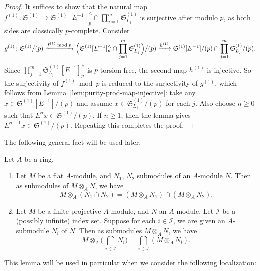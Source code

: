 \begin{proof} 
It suffices to show that the natural map $f^{(1)}\colon \mathfrak{S}^{(1)} \to \mathfrak{S}^{(1)} [E^{-1}]^{\wedge}_p \cap  \prod_{j=1}^m  \mathfrak{S}_{L_j}^{(1)}$ is surjective after modulo $p$, as both sides are classically $p$-complete. Consider 
\[ 
g^{(1)}\colon \mathfrak{S}^{(1)}/(p) \xrightarrow{f^{(1)}\bmod{p}} 
\Bigl( \mathfrak{S}^{(1)} [E^{-1}]^{\wedge}_p \cap \prod_{j =1}^m  \mathfrak{S}_{L_j}^{(1)}\Bigr)/(p)
\xrightarrow{h^{(1)}} \mathfrak{S}^{(1)}[E^{-1}]/(p) \cap \prod_{j=1}^m \mathfrak{S}_{L_j}^{(1)}/(p).
\]
Since $\prod_{j =1}^m  \mathfrak{S}_{L_j}^{(1)}[E^{-1}]^{\wedge}_p$ is $p$-torsion free, the second map $h^{(1)}$ is injective. So the surjectivity of $f^{(1)}\bmod{p}$ is reduced to the surjectivity of $g^{(1)}$, which follows from Lemma~\ref{lem:purity-prod-map-injective}: take any $x\in \mathfrak{S}^{(1)} [E^{-1}]/(p)$ and assume $x\in \mathfrak{S}_{L_j}^{(1)}/(p)$ for each $j$. Also choose $n\geq 0$ such that $E^nx\in \mathfrak{S}^{(1)}/(p)$. If $n\geq 1$, then the lemma gives $E^{n-1}x\in \mathfrak{S}^{(1)}/(p)$. Repeating this completes the proof.
\end{proof}

The following general fact will be used later.

\begin{lem} \label{lem:intersection-modules-flat-base-change}
Let $A$ be a ring. 
\begin{enumerate}
    \item Let $M$ be a flat $A$-module, and $N_1$, $N_2$ submodules of an $A$-module $N$. Then as submodules of $M\otimes_A N$, we have
\[
M\otimes_A (N_1 \cap N_2) = (M\otimes_A N_1) \cap (M\otimes_A N_2).
\]

    \item Let $M$ be a finite projective $A$-module, and $N$ an $A$-module. Let $\mathcal{I}$ be a (possibly infinite) index set. Suppose for each $i \in \mathcal{I}$, we are given an $A$-submodule $N_i$ of $N$. Then as submodules $M\otimes_A N$, we have
\[
M\otimes_A \bigl(\,\bigcap_{i \in \mathcal{I}} N_i\bigr) = \bigcap_{i \in \mathcal{I}} (M\otimes_A N_i).
\]
\end{enumerate}
\end{lem}

This lemma will be used in particular when we consider the following localization:

